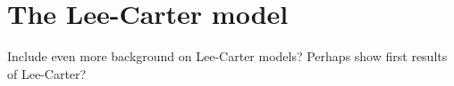 \newpage
\section{The Lee-Carter model}
\label{section:Lee-Carter}
\textcolor{myDarkGreen}{
Include even more background on Lee-Carter models? Perhaps show first results of Lee-Carter?
\newlinw \newline
}


